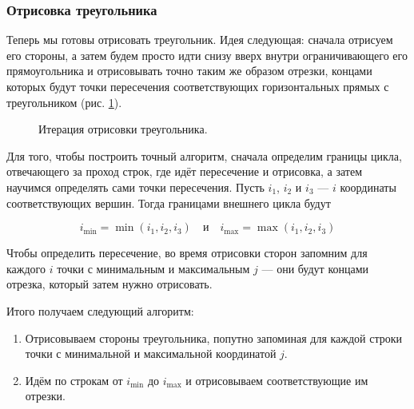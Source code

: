 \documentclass{article}
\begin{document}
\subsubsection{Отрисовка треугольника}

Теперь мы готовы отрисовать треугольник.
Идея следующая: сначала отрисуем его стороны, а затем будем просто идти снизу вверх внутри ограничивающего его прямоугольника и отрисовывать точно таким же образом отрезки, концами которых будут точки пересечения соответствующих горизонтальных прямых с треугольником (рис. \ref{triangle rasterization}).

\begin{figure}[ht]
    \caption{Итерация отрисовки треугольника.}
    \label{triangle rasterization}
\end{figure}

Для того, чтобы построить точный алгоритм, сначала определим границы цикла, отвечающего за проход строк, где идёт пересечение и отрисовка, а затем научимся определять сами точки пересечения.
Пусть $i_{1}$, $i_{2}$ и $i_{3}$ --- $i$ координаты соответствующих вершин.
Тогда границами внешнего цикла будут

\begin{equation*}
	i_{\text{min}} = \min(i_{1}, i_{2}, i_{3}) \quad \text{и} \quad i_{\text{max}} = \max(i_{1}, i_{2}, i_{3})
\end{equation*}

Чтобы определить пересечение, во время отрисовки сторон запомним для каждого $i$ точки с минимальным и максимальным $j$ --- они будут концами отрезка, который затем нужно отрисовать.

Итого получаем следующий алгоритм:

\begin{enumerate}
	\item Отрисовываем стороны треугольника, попутно запоминая для каждой строки точки с минимальной и максимальной координатой $j$.
	\item Идём по строкам от $i_{\text{min}}$ до $i_{\text{max}}$ и отрисовываем соответствующие им отрезки.
\end{enumerate}
\end{document}
